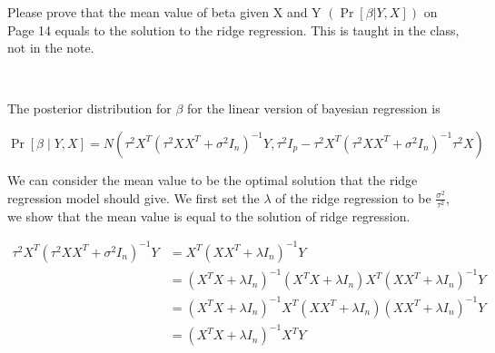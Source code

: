 \begin{exercise}[]{Please prove that the mean value of beta given X and Y $(\Pr[\beta | Y, X])$ on Page 14 equals to the solution to the ridge regression. This is taught in the class, not in the note.}
  \begin{solution}
  \par{~}

The posterior distribution for $\beta$ for the linear version of bayesian regression is

$$
\operatorname{Pr}[\beta \mid Y, X]=N\left(\tau^{2} X^{T}\left(\tau^{2} X X^{T}+\sigma^{2} I_{n}\right)^{-1} Y, \tau^{2} I_{p}-\tau^{2} X^{T}\left(\tau^{2} X X^{T}+\sigma^{2} I_{n}\right)^{-1} \tau^{2} X\right)
$$

We can consider the mean value to be the optimal solution that the ridge regression model should give. We first set the $\lambda$ of the ridge regression to be $\frac{\sigma^2}{\tau^2}$, we show that the mean value is equal to the solution of ridge regression.

\begin{equation}
    \begin{aligned}
    \tau^{2} X^{T}\left(\tau^{2} X X^{T}+\sigma^{2} I_{n}\right)^{-1} Y &= X^T(XX^T+\lambda I_n)^{-1} Y\\
    &=(X^TX+\lambda I_n)^{-1}(X^TX+\lambda I_n) X^T(XX^T+\lambda I_n)^{-1} Y \\
    &=(X^TX+\lambda I_n)^{-1}X^T(XX^T+\lambda I_n) (XX^T+\lambda I_n)^{-1} Y \\
    &=(X^TX+\lambda I_n)^{-1}X^T Y 
    \end{aligned}
\end{equation}

  \end{solution}
  \label{ex1}
\end{exercise}